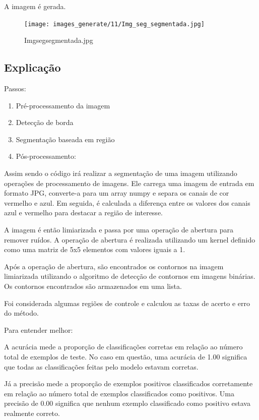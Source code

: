 \documentclass[10pt,a4paper]{article}
\begin{document}
A imagem é gerada.

\begin{figure}[H]
    \centering
    \texttt{[image: images\_generate/11/Img\_seg\_segmentada.jpg]}
    \caption{Img\textunderscore seg\textunderscore segmentada.jpg}
\end{figure}



\subsection{Explicação}

Passos: 

\begin{enumerate}
    \item Pré-processamento da imagem
    \item Detecção de borda
    \item Segmentação baseada em região
    \item Pós-processamento:
\end{enumerate} 

Assim sendo o código irá realizar a segmentação de uma imagem utilizando operações de processamento de imagens. Ele carrega uma imagem de entrada em formato JPG, converte-a para um array numpy e separa os canais de cor vermelho e azul. Em seguida, é calculada a diferença entre os valores dos canais azul e vermelho para destacar a região de interesse. 

A imagem é então limiarizada e passa por uma operação de abertura para remover ruídos. A operação de abertura é realizada utilizando um kernel definido como uma matriz de 5x5 elementos com valores iguais a 1. 

Após a operação de abertura, são encontrados os contornos na imagem limiarizada utilizando o algoritmo de detecção de contornos em imagens binárias. Os contornos encontrados são armazenados em uma lista. 

Foi considerada algumas regiões de controle e calculou as taxas de acerto e erro do método. 

Para entender melhor:

A acurácia mede a proporção de classificações corretas em relação ao número total de exemplos de teste. No caso em questão, uma acurácia de 1.00 significa que todas as classificações feitas pelo modelo estavam corretas.
 
Já a precisão mede a proporção de exemplos positivos classificados corretamente em relação ao número total de exemplos classificados como positivos. Uma precisão de 0.00 significa que nenhum exemplo classificado como positivo estava realmente correto.
 
\end{document}
